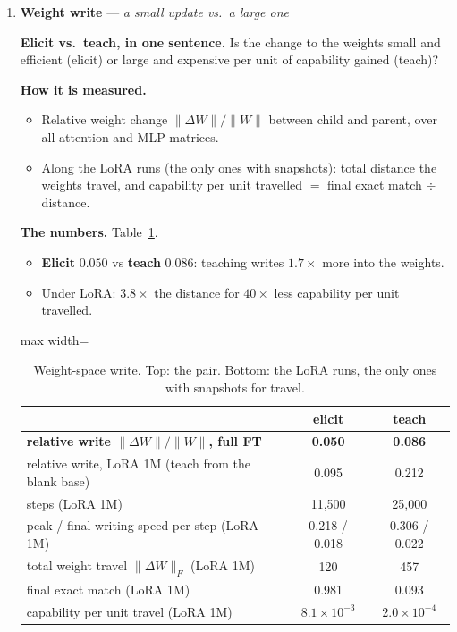 \documentclass[11pt]{article}
\newcommand{\what}[1]{\par\noindent\textbf{Elicit vs.\ teach, in one sentence.} #1}
\newcommand{\how}[1]{\par\noindent\textbf{How it is measured.} #1}
\newcommand{\numbers}[1]{\par\noindent\textbf{The numbers.} #1\par\medskip}
\newenvironment{steps}{\begin{itemize}[nosep,leftmargin=1.2em,topsep=2pt]}{\end{itemize}}
\newcommand{\metricsec}[2]{\item \textbf{#1} --- \emph{#2}}
\begin{document}
\begin{enumerate}[label=\textbf{M\arabic*}, leftmargin=*, itemsep=1.2em, resume]
\metricsec{Weight write}{a small update vs.\ a large one}
\what{Is the change to the weights small and efficient (elicit) or large and expensive per unit
of capability gained (teach)?}
\how{
\begin{steps}
\item Relative weight change $\|\Delta W\|/\|W\|$ between child and parent, over all attention
and MLP matrices.
\item Along the LoRA runs (the only ones with snapshots): total distance the weights travel, and
capability per unit travelled $=$ final exact match $\div$ distance.
\end{steps}}
\numbers{Table~\ref{tab:weights}.
\begin{steps}
\item \textbf{Elicit} $0.050$ vs \textbf{teach} $0.086$: teaching writes $1.7\times$ more into the
weights.
\item Under LoRA: $3.8\times$ the distance for $40\times$ less capability per unit travelled.
\end{steps}}
\begin{table}[h]\centering\small
\begin{adjustbox}{max width=\textwidth}
\begin{tabular}{lcc}
\toprule
 & elicit & teach \\
\midrule
\textbf{relative write $\|\Delta W\|/\|W\|$, full FT} & \textbf{0.050} & \textbf{0.086} \\
\midrule
relative write, LoRA 1M (teach from the blank base) & 0.095 & 0.212 \\
steps (LoRA 1M) & 11{,}500 & 25{,}000 \\
peak / final writing speed per step (LoRA 1M) & 0.218 / 0.018 & 0.306 / 0.022 \\
total weight travel $\|\Delta W\|_F$ (LoRA 1M) & 120 & 457 \\
final exact match (LoRA 1M) & 0.981 & 0.093 \\
capability per unit travel (LoRA 1M) & $8.1\times10^{-3}$ & $2.0\times10^{-4}$ \\
\bottomrule
\end{tabular}
\end{adjustbox}
\caption{Weight-space write. Top: the pair. Bottom: the LoRA runs, the only ones with snapshots
for travel.}
\label{tab:weights}
\end{table}


\end{enumerate}
\end{document}
